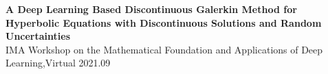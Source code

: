 \documentclass[letterpaper,10.8pt]{article}
\begin{document}
\textbf{\color{MSLightBlue} A Deep Learning Based  Discontinuous Galerkin Method for Hyperbolic Equations with Discontinuous Solutions and Random Uncertainties}\\

IMA Workshop on the Mathematical Foundation and Applications of Deep Learning,Virtual \hfill 2021.09
\end{document}
